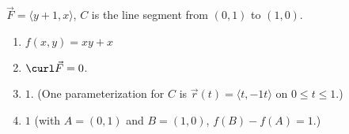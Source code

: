 {$\vec F = \langle y+1,x\rangle$, $C$ is the line segment from $(0,1)$ to $(1,0)$.
}
{\begin{enumerate}
\item		$f(x,y) = xy+x$
\item	$\curl \vec F = 0$.
\item		$1$. (One parameterization for $C$ is $\vec r(t) = \langle t,-1 t\rangle$ on $0\leq t\leq 1$.)
\item	$1$ (with $A = (0,1)$ and $B = (1,0)$, $f(B) - f(A) = 1$.)
\end{enumerate}
}
